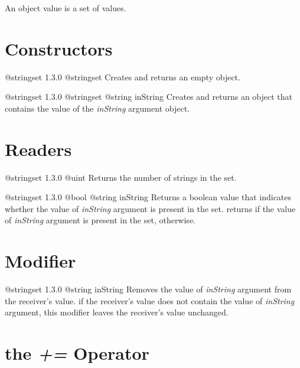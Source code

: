 

An  object value is a set of  values.\\

\section{Constructors}

{@stringset}
{1.3.0}
{@stringset}
{Creates and returns an empty  object.}
{}

{@stringset}
{1.3.0}
{@stringset}
{@string inString}
{Creates and returns an  object that contains the value of the \emph{inString} argument object.}
{}

\section{Readers}

{@stringset}
{1.3.0}
{@uint}
{Returns the number of strings in the set.}
{}



{@stringset}
{1.3.0}
{@bool}
{@string inString}
{Returns a boolean value that indicates whether the value of \emph{inString} argument is present in the set.}
{returns  if the value of \emph{inString} argument is present in the set,  otherwise.}


\section{Modifier}

{@stringset}
{1.3.0}
{@string inString}
{Removes the value of \emph{inString} argument from the receiver's value.}
{if the receiver's value does not contain the value of \emph{inString} argument, this modifier leaves the receiver's value unchanged.}






\section{the \emph{+=} Operator}

